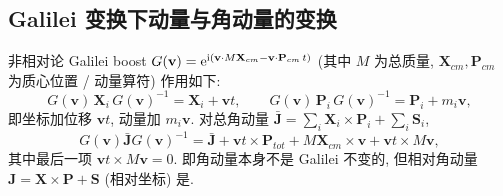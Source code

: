 \subsection{Galilei 变换下动量与角动量的变换}\label{sec:inv-galilei-trans}

\begin{proposition}\label{prop:inv-galilei}
非相对论 Galilei boost $G(\mathbf{v})=\mathrm{e}^{\mathrm{i} (\mathbf{v}\cdot M\mathbf{X}_{cm}-\mathbf{v}\cdot \mathbf{P}_{cm}\,t)}$ (其中 $M$ 为总质量, $\mathbf{X}_{cm}, \mathbf{P}_{cm}$ 为质心位置 / 动量算符) 作用如下:
\begin{equation}\label{eq:inv-G-rules}
G(\mathbf{v})\,\mathbf{X}_i\,G(\mathbf{v})^{-1}=\mathbf{X}_i+\mathbf{v}t,\qquad G(\mathbf{v})\,\mathbf{P}_i\,G(\mathbf{v})^{-1}=\mathbf{P}_i+m_i\mathbf{v},
\end{equation}
即坐标加位移 $\mathbf{v}t$, 动量加 $m_i\mathbf{v}$. 对总角动量 $\bar{\mathbf{J}}=\sum_i \mathbf{X}_i\times \mathbf{P}_i+\sum_i \mathbf{S}_i$,
\begin{equation}\label{eq:inv-Gjr-J}
G(\mathbf{v})\bar{\mathbf{J}}G(\mathbf{v})^{-1}=\bar{\mathbf{J}}+\mathbf{v}t \times \mathbf{P}_{tot}+M\mathbf{X}_{cm}\times \mathbf{v}+\mathbf{v}t\times M\mathbf{v},
\end{equation}
其中最后一项 $\mathbf{v}t\times M\mathbf{v}=0$. 即角动量本身不是 Galilei 不变的, 但相对角动量 $\mathbf{J}=\mathbf{X}\times\mathbf{P}+\mathbf{S}$ (相对坐标) 是.
\end{proposition}

